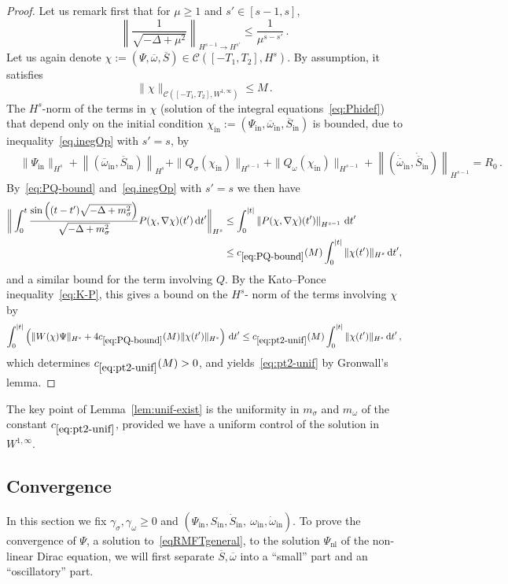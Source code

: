 \documentclass[AHL,Unicode,longabstracts,published]{cedram}
\newcommand{\rmin}{\mathrm{in}}
\newcommand{\nl}{\mathrm{nl}}
\newcommand{\cC}{\mathcal{C}}
\newcommand\ii{{\ensuremath {\infty}}}
\renewcommand\d[1]{{\ensuremath{\,\text{d}#1}}}
\begin{document}
\begin{proof}
Let us remark first that for $\mu\geq 1$ and $s'\in[s-1,s]$,
\begin{equation}\label{eq.inegOp}
\left\|\frac{1}{\sqrt{-\Delta+\mu^2}}\right\|_{H^{s-1}\to H^{s'}} \leq \frac{1}{\mu^{s-s'}}\,.
\end{equation}
Let us again denote $\chi := (\Psi,\overline{\omega},\overline{S})\in \cC([-T_1,T_2],{H}^s)$. By assumption, it satisfies
\[
\|\chi\|_{\cC\left([-T_1,T_2],W^{1,\infty}\right)}
\leq M\,.
\]
The $H^s$-norm of the terms in $\chi$ (solution of the integral equations~\eqref{eq:Phidef}) that depend only on the initial condition $\chi_\rmin:=(\Psi_\rmin, \overline{\omega}_\rmin,\overline{S}_\rmin)$ is bounded, due to inequality~\eqref{eq.inegOp} with $s'=s$, by
\begin{align*}
&\|\Psi_\rmin\|_{H^s} +
\left\|(\overline{\omega}_\rmin,\overline{S}_\rmin) \right\|_{H^s} +
\|Q_\sigma(\chi_\rmin)\|_{H^{s-1}} + \|Q_\omega(\chi_\rmin)\|_{H^{s-1}} +
\left\|(\dot{\overline{\omega}}_\rmin,\dot{\overline{S}}_\rmin)\right\|_{H^{s-1}}=R_0\,.
\end{align*}
By~\eqref{eq:PQ-bound} and~\eqref{eq.inegOp} with $s'=s$ we then have
\begin{align*}
\bigg\| \int_0^t\frac{\sin\left((t-t')\sqrt{-\Delta + m^2_\sigma}\right)}{\sqrt{-\Delta + m^2_\sigma}}P(\chi, \nabla\chi)(t')\d t'\bigg\|_{H^s} &\leq
\int_0^{|t|}\left\| P(\chi, \nabla\chi)(t')\right\|_{H^{s-1}} \d t' \\
&\leq c_{\eqref{eq:PQ-bound}}(M) \int_0^{|t|} \|\chi(t')\|_{H^s}\d t',
\end{align*}
and a similar bound for the term involving $Q$. By the Kato--Ponce inequality~\eqref{eq:K-P}, this gives a bound on the $H^s$- norm of the terms involving $\chi$ by
\[
\int_0^{|t|}
\left(
\|W(\chi)\Psi\|_{H^s}+ 4 c_{\eqref{eq:PQ-bound}} (M)\|\chi(t')\|_{H^s} \right)\d t'
\leq c_{\eqref{eq:pt2-unif}}(M)\int_0^{|t|}
\|\chi(t')\|_{{H}^s}\d t'\,,
\]
which determines $c_{\eqref{eq:pt2-unif}}(M)>0$, and yields~\eqref{eq:pt2-unif} by Gronwall's lemma.
\end{proof}

\begin{rema}
The key point of Lemma~\ref{lem:unif-exist} is the uniformity in $m_\sigma$ and $m_\omega$ of the constant $c_{\eqref{eq:pt2-unif}}$, provided we have a uniform control of the solution in $W^{1,\ii}$.
\end{rema}


\subsection{Convergence} 
In this section we fix $\gamma_\sigma, \gamma_\omega\geq 0$ and $(\Psi_\rmin, S_\rmin, \dot S_\rmin, \ \omega_\rmin, \dot \omega_\rmin)$. To prove the convergence of $\Psi$, a solution to~\eqref{eqRMFTgeneral}, to the solution $\Psi_\nl$ of the non-linear Dirac equation, we will first separate $\overline{S}, \overline{\omega}$ into a ``small'' part and an ``oscillatory'' part.
\end{document}
